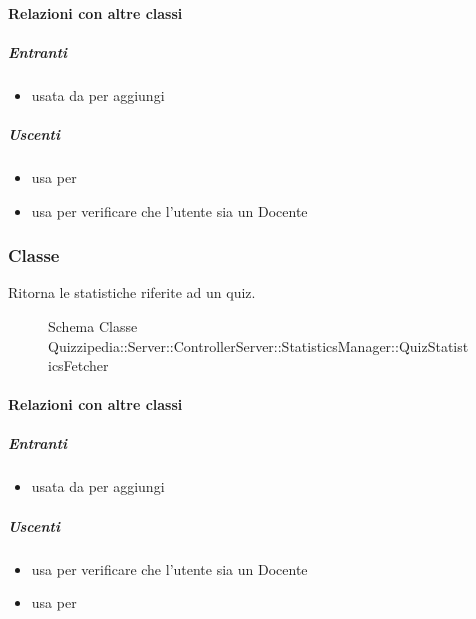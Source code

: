 \paragraph{Relazioni con altre classi}
\subparagraph{Entranti}
\begin{itemize}
\item usata da  per aggiungi
\end{itemize}
\subparagraph{Uscenti}
\begin{itemize}
\item usa  per 
\item usa  per verificare che l'utente sia un Docente
\end{itemize}
\subsubsection{Classe }
Ritorna le statistiche riferite ad un quiz.
\begin{figure}[H]
\centering
\noindent{}
\caption[Schema Classe QuizStatisticsFetcher]{Schema Classe Quizzipedia::Server::ControllerServer::StatisticsManager::QuizStatisticsFetcher}
\end{figure}
\paragraph{Relazioni con altre classi}
\subparagraph{Entranti}
\begin{itemize}
\item usata da  per aggiungi
\end{itemize}
\subparagraph{Uscenti}
\begin{itemize}
\item usa  per verificare che l'utente sia un Docente
\item usa  per 
\end{itemize}
